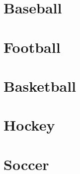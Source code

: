\documentclass[
  11pt,
]{book}
\theoremstyle{definition}
\theoremstyle{definition}
\theoremstyle{definition}
\theoremstyle{definition}
\theoremstyle{remark}
\begin{document}
\hypertarget{baseball-1}{%
\chapter{Baseball}\label{baseball-1}}

\hypertarget{football-1}{%
\chapter{Football}\label{football-1}}

\hypertarget{basketball-1}{%
\chapter{Basketball}\label{basketball-1}}

\hypertarget{hockey-1}{%
\chapter{Hockey}\label{hockey-1}}

\hypertarget{soccer-1}{%
\chapter{Soccer}\label{soccer-1}}

  
\end{document}
